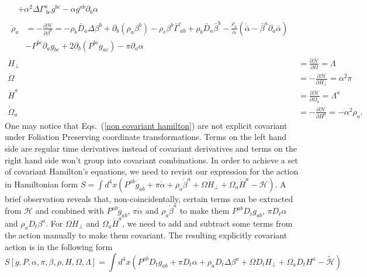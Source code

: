 \documentclass[letterpaper,nofootinbib,prd,amsmath,onecolumn]{revtex4-1}
\begin{document}
\begin{subequations}
\begin{align}
\begin{split}
& + \alpha^{2}\Delta \Gamma^{a}_{~bc}g^{bc} - \alpha g^{ab}\partial_{b}\alpha
\end{split}\\
\begin{split}
{\dot \rho}_{a} & = -\frac{\partial \mathscr{H}}{\partial \beta^{a}} = - \rho_{b}{\bar D}_{a}\Delta\beta^{b} + \partial_{b}\left(\rho_{a}\beta^{b}\right) - \rho_{c}\beta^{b}{\bar \Gamma}^{c}_{~ab} + \rho_{b}{\bar D}_{a}{\bar \beta}^{b} - \frac{\rho_{a}}{{\bar \alpha}}\left({\dot {\bar \alpha}} - {\bar \beta}^{a}\partial_{a}{\bar \alpha}\right)\\
& - P^{bc}\partial_{a}g_{bc} + 2\partial_{b}\left(P^{bc}g_{ac}\right) - \pi \partial_{a}\alpha
\end{split}\\
{\dot H}_{\perp} & = \frac{\partial \mathscr{H}}{\partial \Omega } = \Lambda\\
{\dot \Omega} & = - \frac{\partial \mathscr{H}}{\partial H_{\perp}} = \alpha^{2}\pi\\
{\dot H}^{a} & = \frac{\partial \mathscr{H}}{\partial \Omega_{a}} = \Lambda^{a}\\
{\dot \Omega}_{a} & = - \frac{\partial \mathscr{H}}{\partial H^{a}} = -\alpha^{2}\rho_{a}.
\end{align}
\end{subequations}
One may notice that Eqs.~(\ref{non covariant hamilton}) are not explicit covariant under Foliation Preserving coordinate transformations. Terms on the left hand side are regular time derivatives instead of covariant derivatives and terms on the right hand side won't group into covariant combinations. In order to achieve a set of covariant Hamilton's equations, we need to revisit our expression for the action in Hamiltonian form $S = \int d^{4}x\left( P^{ab}{\dot g}_{ab} + \pi{\dot \alpha} + \rho_{a}{\dot \beta}^{a} + \Omega {\dot H}_{\perp} + \Omega_{a}{\dot H}^{a} - \mathscr{H}\right)$. A brief observation reveals that, non-coincidentally,  certain terms can be extracted from $\mathscr{H}$ and combined with $P^{ab}{\dot g}_{ab}$, $\pi{\dot \alpha}$ and $\rho_{a}{\dot \beta}^{a}$ to make them $P^{ab}D_{t}g_{ab}$, $\pi D_{t}\alpha$ and $\rho_{a} D_{t}\beta^{a}$. For $\Omega {\dot H}_{\perp}$ and $\Omega_{a} {\dot H}^{a}$, we need to add and subtract some terms from the action manually to make them covariant. The resulting explicitly covariant action is in the following form
\begin{equation}
S[g, P, \alpha, \pi, \beta, \rho, H, \Omega, \Lambda ] = \int d^{4}x \left( P^{ab}D_{t}g_{ab} + \pi D_{t}\alpha + \rho_{a}D_{t}\Delta \beta^{a} + \Omega D_{t}H_{\perp} + \Omega_{a}D_{t}H^{a} - \tilde{\mathscr{H}}\right)
\end{equation}
\end{document}

